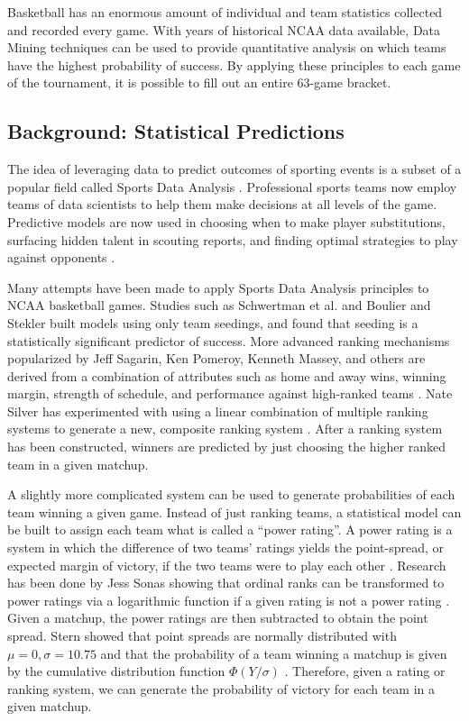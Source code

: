 \documentclass[]{article}
\begin{document}
Basketball has an enormous amount of individual and team statistics collected and recorded every game. With years of historical NCAA data available, Data Mining techniques can be used to provide quantitative analysis on which teams have the highest probability of success. By applying these principles to each game of the tournament, it is possible to fill out an entire 63-game bracket.

\subsection{Background: Statistical Predictions}
\label{subsec:stat_predictions}

The idea of leveraging data to predict outcomes of sporting events is a subset of a popular field called Sports Data Analysis \cite{sda}. Professional sports teams now employ teams of data scientists to help them make decisions at all levels of the game. Predictive models are now used in choosing when to make player substitutions, surfacing hidden talent in scouting reports, and finding optimal strategies to play against opponents \cite{sda}.

Many attempts have been made to apply Sports Data Analysis principles to NCAA basketball games. Studies such as Schwertman et al. \cite{moreprobmodels} and Boulier and Stekler \cite{seedingpredictors} built models using only team seedings, and found that seeding is a statistically significant predictor of success. More advanced ranking mechanisms popularized by Jeff Sagarin, Ken Pomeroy, Kenneth Massey, and others are derived from a combination of attributes such as home and away wins, winning margin, strength of schedule, and performance against high-ranked teams \cite{predictingmarchmadness}. Nate Silver has experimented with using a linear combination of multiple ranking systems to generate a new, composite ranking system \cite{natesilver}. After a ranking system has been constructed, winners are predicted by just choosing the higher ranked team in a given matchup.

A slightly more complicated system can be used to generate probabilities of each team winning a given game. Instead of just ranking teams, a statistical model can be built to assign each team what is called a ``power rating''. A power rating is a system in which the difference of two teams' ratings yields the point-spread, or expected margin of victory, if the two teams were to play each other \cite{rankingsystems}. Research has been done by Jess Sonas showing that ordinal ranks can be transformed to power ratings via a logarithmic function if a given rating is not a power rating \cite{jeffsonas}. Given a matchup, the power ratings are then subtracted to obtain the point spread. Stern showed that point spreads are normally distributed with $\mu = 0, \sigma = 10.75$ and that the probability of a team winning a matchup is given by the cumulative distribution function $\Phi(Y/\sigma)$ \cite{pointspreadstoprob}. Therefore, given a rating or ranking system, we can generate the probability of victory for each team in a given matchup.
\end{document}
